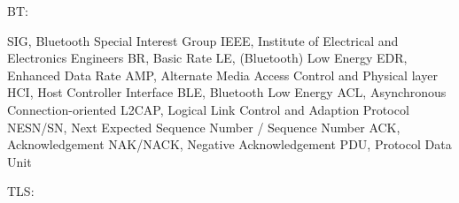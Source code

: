 BT:

SIG, Bluetooth Special Interest Group
IEEE, Institute of Electrical and Electronics Engineers
BR, Basic Rate
LE, (Bluetooth) Low Energy
EDR, Enhanced Data Rate
AMP, Alternate Media Access Control and Physical layer 
HCI, Host Controller Interface
BLE, Bluetooth Low Energy
ACL, Asynchronous Connection-oriented
L2CAP, Logical Link Control and Adaption Protocol
NESN/SN, Next Expected Sequence Number / Sequence Number
ACK, Acknowledgement
NAK/NACK, Negative Acknowledgement
PDU, Protocol Data Unit

TLS:

